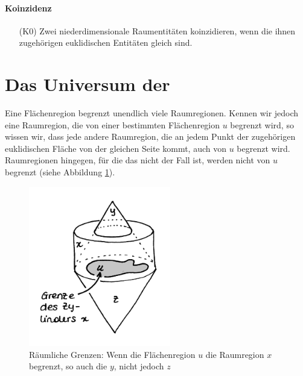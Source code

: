 	\paragraph{Koinzidenz} 
	\begin{itemize}
	    \item[(K0)] Zwei niederdimensionale Raumentitäten koinzidieren, wenn die ihnen zugehörigen euklidischen Entitäten gleich sind.
	\end{itemize}

	
    \section{Das Universum der \strukt}\label{sec:universum}

        Eine Flächenregion begrenzt unendlich viele Raumregionen.
        Kennen wir jedoch eine Raumregion, die von einer bestimmten Flächenregion $u$ begrenzt wird, so wissen wir, dass jede andere Raumregion, die an jedem Punkt der zugehörigen euklidischen Fläche von der gleichen Seite kommt, auch von $u$ begrenzt wird.
        Raumregionen hingegen, für die das nicht der Fall ist, werden nicht von $u$ begrenzt (siehe Abbildung \ref{fig:sb}).

        \begin{figure}[ht]
            \centering
            \includegraphics[height=7cm]{bearbeitet-22-04-25/sb.png}
            \caption[Räumliche Grenzen]{Räumliche Grenzen: Wenn die Flächenregion $u$ die Raumregion $x$ begrenzt, so auch die $y$, nicht jedoch $z$}
            \label{fig:sb}
        \end{figure}

